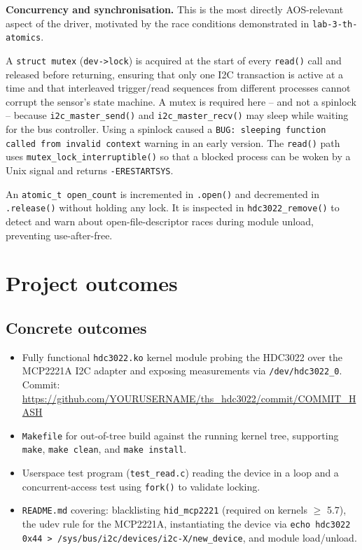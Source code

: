 \documentclass[10pt,a4]{article}
\begin{document}
\textbf{Concurrency and synchronisation.}
This is the most directly AOS-relevant aspect of the driver, motivated by the
race conditions demonstrated in \texttt{lab-3-th-atomics}.

A \texttt{struct mutex} (\texttt{dev->lock}) is acquired at the start of every
\texttt{read()} call and released before returning, ensuring that only one I2C
transaction is active at a time and that interleaved trigger/read sequences from
different processes cannot corrupt the sensor's state machine. A mutex is required
here -- and not a spinlock -- because \texttt{i2c\_master\_send()} and
\texttt{i2c\_master\_recv()} may sleep while waiting for the bus controller.
Using a spinlock caused a \texttt{BUG: sleeping function called from invalid
context} warning in an early version. The \texttt{read()} path uses
\texttt{mutex\_lock\_interruptible()} so that a blocked process can be woken
by a Unix signal and returns \texttt{-ERESTARTSYS}.

An \texttt{atomic\_t open\_count} is incremented in \texttt{.open()} and
decremented in \texttt{.release()} without holding any lock. It is inspected in
\texttt{hdc3022\_remove()} to detect and warn about open-file-descriptor races
during module unload, preventing use-after-free.

\section{Project outcomes}

\subsection{Concrete outcomes}

\begin{itemize}
  \item Fully functional \texttt{hdc3022.ko} kernel module probing the HDC3022
  over the MCP2221A I2C adapter and exposing measurements via
  \texttt{/dev/hdc3022\_0}.\\
  Commit: \url{https://github.com/YOURUSERNAME/ths_hdc3022/commit/COMMIT_HASH}

  \item \texttt{Makefile} for out-of-tree build against the running kernel tree,
  supporting \texttt{make}, \texttt{make clean}, and \texttt{make install}.

  \item Userspace test program (\texttt{test\_read.c}) reading the device in a
  loop and a concurrent-access test using \texttt{fork()} to validate locking.

  \item \texttt{README.md} covering: blacklisting \texttt{hid\_mcp2221} (required
  on kernels $\geq$ 5.7), the udev rule for the MCP2221A, instantiating the device
  via \texttt{echo hdc3022 0x44 > /sys/bus/i2c/devices/i2c-X/new\_device}, and
  module load/unload.
\end{itemize}
\end{document}
